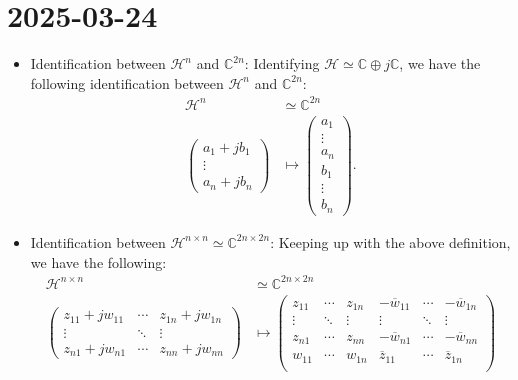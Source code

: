 \documentclass{report}
\begin{document}
\section{2025-03-24}
\begin{itemize}
    \item Identification between $\mathcal H^n$ and $\mathbb C^{2n}$:
    Identifying $\mathcal H \simeq \mathbb C \oplus j \mathbb C$, we have the following identification between $\mathcal H^n$ and $\mathbb C^{2n}$:
    \begin{align*}
        \mathcal H^n &\simeq \mathbb C^{2n} \\
        \begin{pmatrix}
            a_1 + j b_1 \\
            \vdots \\
            a_n + j b_n
        \end{pmatrix} &\mapsto \begin{pmatrix}
            a_1 \\
            \vdots \\
            a_n \\
            b_1 \\
            \vdots \\
            b_n
        \end{pmatrix}.
    \end{align*}
    \item Identification between $\mathcal H^{n \times n} \simeq \mathbb C^{2n \times 2n}$:
    Keeping up with the above definition, we have the following:
    \begin{align*}
        \mathcal H^{n \times n} &\simeq \mathbb C^{2n \times 2n} \\
        \begin{pmatrix}
            z_{11} + j w_{11} & \cdots & z_{1n} + j w_{1n} \\
            \vdots & \ddots & \vdots \\
            z_{n1} + j w_{n1} & \cdots & z_{nn} + j w_{nn}
        \end{pmatrix} &\mapsto \begin{pmatrix}
            z_{11} & \cdots & z_{1n} & -\overline w_{11} & \cdots & -\overline w_{1n} \\
            \vdots & \ddots & \vdots & \vdots & \ddots & \vdots \\
            z_{n1} & \cdots & z_{nn} & -\overline w_{n1} & \cdots & -\overline w_{nn} \\
            w_{11} & \cdots & w_{1n} & \overline z_{11} & \cdots & \overline z_{1n} \\

\end{pmatrix}
\end{align*}
\end{itemize}
\end{document}
